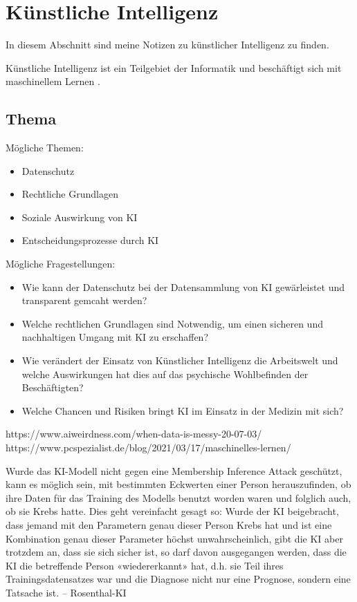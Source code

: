 \section{Künstliche Intelligenz}
\label{sec:ai}

In diesem Abschnitt sind meine Notizen zu künstlicher Intelligenz zu finden.

Künstliche Intelligenz ist ein Teilgebiet der Informatik und beschäftigt sich mit maschinellem Lernen \citep{ai-wikipedia}.
\newline

\subsection{Thema}
\setlength{\parindent}{0pt}
Mögliche Themen:
    \begin{itemize}
    \item Datenschutz
    \item Rechtliche Grundlagen
    \item Soziale Auswirkung von KI 
    \item Entscheidungsprozesse durch KI 
    \end{itemize}
Mögliche Fragestellungen:
    \begin{itemize}
    \item Wie kann der Datenschutz bei der Datensammlung von KI gewärleistet und transparent gemcaht werden?
    \item Welche rechtlichen Grundlagen sind Notwendig, um einen sicheren und nachhaltigen Umgang mit KI zu erschaffen?
    \item Wie verändert der Einsatz von Künstlicher Intelligenz die Arbeitswelt und welche Auswirkungen hat dies auf das psychische Wohlbefinden der Beschäftigten?
    \item Welche Chancen und Risiken bringt KI im Einsatz in der Medizin mit sich?
    \end{itemize}
\newpage





https://www.aiweirdness.com/when-data-is-messy-20-07-03/
https://www.pcspezialist.de/blog/2021/03/17/maschinelles-lernen/

Wurde das KI-Modell nicht gegen
eine Membership Inference Attack geschützt, kann es möglich sein, mit bestimmten Eckwerten
einer Person herauszufinden, ob ihre Daten für das Training des Modells benutzt worden waren
und folglich auch, ob sie Krebs hatte. Dies geht vereinfacht gesagt so: Wurde der KI beigebracht,
dass jemand mit den Parametern genau dieser Person Krebs hat und ist eine Kombination genau
dieser Parameter höchst unwahrscheinlich, gibt die KI aber trotzdem an, dass sie sich sicher ist,
so darf davon ausgegangen werden, dass die KI die betreffende Person «wiedererkannt» hat, d.h.
sie Teil ihres Trainingsdatensatzes war und die Diagnose nicht nur eine Prognose, sondern eine
Tatsache ist. -- Rosenthal-KI


